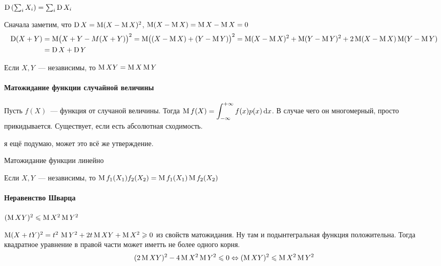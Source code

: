 \documentclass[12pt,timbord]{../../../notes}
\begin{document}
\begin{prop}\label{prop:stat::randsum::var}
  $\operatorname{\mathrm D} \left(\sum_i X_i\right) = \sum_i \operatorname{\mathrm D} X_i$
\end{prop}
\begin{itlproof}
  Сначала заметим, что $\operatorname{\mathrm D} X = \operatorname{\mathrm M} (X- \operatorname{\mathrm M} X)^2$, $\operatorname{\mathrm M} (X - \operatorname{\mathrm M} X) = \operatorname{\mathrm M} X - \operatorname{\mathrm M} X = 0$
  \[
    \begin{split}
      \operatorname{\mathrm D} (X+Y) &= \operatorname{\mathrm M} \bigl(X+Y - M(X+Y)\bigr)^2 = \operatorname{\mathrm M} \bigl((X-\operatorname{\mathrm M} X) +(Y-\operatorname{\mathrm M} Y) \bigr)^2 = 
      \operatorname{\mathrm M} (X-\operatorname{\mathrm M} X)^2 + \operatorname{\mathrm M} (Y-\operatorname{\mathrm M} Y)^2 + 2 \operatorname{\mathrm M} (X-\operatorname{\mathrm M} X) \operatorname{\mathrm M} (Y - \operatorname{\mathrm M} Y)\\ 
      &= \operatorname{\mathrm D} X + \operatorname{\mathrm D} Y
    \end{split}
  \]
\end{itlproof}

\begin{prop}\label{prop:stat::randsum::expmul}
  Если $X,Y$~--- независимы, то $\operatorname{\mathrm M} XY = \operatorname{\mathrm M} X \operatorname{\mathrm M} Y$
\end{prop}
\begin{itlproof}
  
\end{itlproof}

\paragraph{Матожидание функции случайной величины}
\label{par:stat::expfun}

\begin{defn}[$\ddot\sim$]\label{defn:stat::expfun::expfun}
  Пусть $f(X)$~--- функция от случаной величины. Тогда 
  $\displaystyle \operatorname{\mathrm M} f(X) = \int_{-\infty}^{+\infty} f(x) p(x)\, \mathrm{d} x$. В случае чего он многомерный, просто
  прикидывается. Существует, если есть абсолютная сходимость.
\end{defn}
\begin{rem*}
  я ещё подумаю, может это всё же утверждение.
\end{rem*}
\begin{prop}\label{prop:stat::expfun::lin}
  Матожидание функции линейно
\end{prop}
\begin{prop}\label{prop:stat::expfun::mul}
  Если $X,Y$~--- независимы, то $\operatorname{\mathrm M} f_1(X_1)f_2(X_2) = \operatorname{\mathrm M} f_1(X_1) \operatorname{\mathrm M} f_2(X_2)$
\end{prop}


\paragraph{Неравенство Шварца}
\label{par:stat::shwartz}

\begin{prop}\label{prop:stat::shwartz}
  $(\operatorname{\mathrm M}  XY)^2 \leqslant \operatorname{\mathrm M} X^2 \operatorname{\mathrm M} Y^2$
\end{prop}
\begin{itlproof}
  $\operatorname{\mathrm M} (X+ tY)^2 = t^2\,\operatorname{\mathrm M} Y^2 + 2 t \operatorname{\mathrm M} XY + \operatorname{\mathrm M} X^2 \geqslant 0$ из свойств матожидания. Ну
  там и подынтегральная функция положительна. Тогда квадратное уравнение в правой части может
  иметть не более одного корня.
  \[
    (2 \operatorname{\mathrm M} XY)^2 - 4 \operatorname{\mathrm M} X^2 \operatorname{\mathrm M} Y^2 \leqslant 0 \Leftrightarrow 
    (\operatorname{\mathrm M}  XY)^2 \leqslant \operatorname{\mathrm M} X^2 \operatorname{\mathrm M} Y^2
  \]
\end{itlproof}
\end{document}
